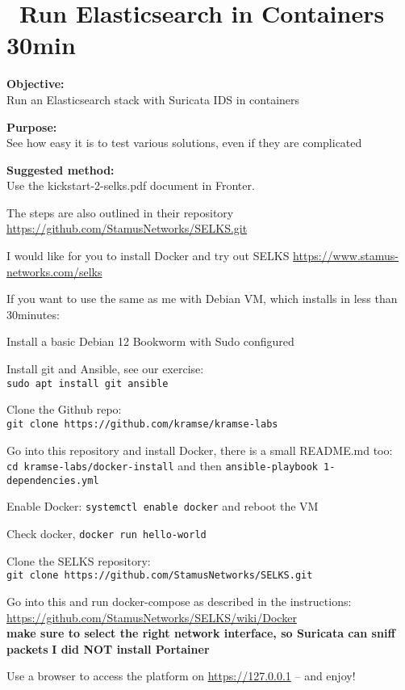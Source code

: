 \documentclass[a4paper,11pt,notitlepage]{report}
\begin{document}
\chapter{\faInfoCircle\ Run Elasticsearch in Containers 30min}
\label{ex:selks}

{\bf Objective:}\\
Run an Elasticsearch stack with Suricata IDS in containers

{\bf Purpose:}\\
See how easy it is to test various solutions, even if they are complicated

{\bf Suggested method:}\\
Use the kickstart-2-selks.pdf document in Fronter.

The steps are also outlined in their repository \url{https://github.com/StamusNetworks/SELKS.git}

I would like for you to install Docker and try out SELKS \url{https://www.stamus-networks.com/selks}

If you want to use the same as me with Debian VM, which installs in less than 30minutes:
\begin{list1}
\item[\faSquareO] Install a basic Debian 12 Bookworm with Sudo configured
\item[\faSquareO] Install git and Ansible, see our exercise:\\
\verb+sudo apt install git ansible+
\item[\faSquareO] Clone the Github repo: \\
\verb+git clone https://github.com/kramse/kramse-labs+
\item[\faSquareO] Go into this repository and install Docker, there is a small README.md too:\\
\verb+cd kramse-labs/docker-install+ and then \verb+ansible-playbook 1-dependencies.yml+
\item[\faSquareO] Enable Docker: \verb+systemctl enable docker+ and reboot the VM
\item[\faSquareO] Check docker, \verb+docker run hello-world+
\item[\faSquareO] Clone the SELKS repository:\\
\verb+git clone https://github.com/StamusNetworks/SELKS.git+
\item[\faSquareO] Go into this and run docker-compose as described in the instructions:\\
\url{https://github.com/StamusNetworks/SELKS/wiki/Docker}\\
{\bf  make sure to select the right network interface, so Suricata can sniff packets}
{\bf I did NOT install Portainer}
\item[\faSquareO] Use a browser to access the platform on \url{https://127.0.0.1} -- and enjoy!
\end{list1}
\end{document}
